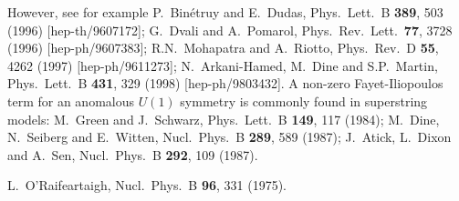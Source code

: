 \documentclass[12pt]{article}
\begin{document}
\begin{thebibliography}{999}
 However, see for example
P.~Bin\'etruy and  E.~Dudas, 
  Phys.\ Lett.\ B {\bf 389}, 503 (1996)
  [hep-th/9607172];
G.~Dvali and A.~Pomarol, 
  Phys.\ Rev.\ Lett.\  {\bf 77}, 3728 (1996)
  [hep-ph/9607383];
R.N.~Mohapatra and A.~Riotto, 
  Phys.\ Rev.\ D {\bf 55}, 4262 (1997)
  [hep-ph/9611273];
N.~Arkani-Hamed, M.~Dine and S.P.~Martin,
  Phys.\ Lett.\ B {\bf 431}, 329 (1998)
  [hep-ph/9803432].
A non-zero Fayet-Iliopoulos term for an anomalous $U(1)$ symmetry
is commonly found in superstring models:
M.~Green and J.~Schwarz, 
  Phys.\ Lett.\ B {\bf 149}, 117 (1984);
M.~Dine, N.~Seiberg and E.~Witten, 
  Nucl.\ Phys.\ B {\bf 289}, 589 (1987);
J.~Atick, L.~Dixon and A.~Sen, 
  Nucl.\ Phys.\ B {\bf 292}, 109 (1987).

L.~O'Raifeartaigh, 
  Nucl.\ Phys.\ B {\bf 96}, 331 (1975).


\end{thebibliography}
\end{document}
